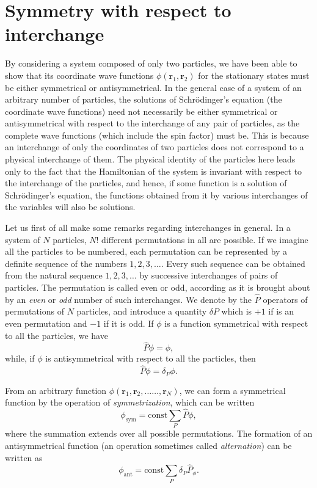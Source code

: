 \section{Symmetry with respect to interchange}\label{Symmetry with respect to interchange}
By considering a system composed of only two particles, we have been able to show that its coordinate wave functions $ \phi(\bm{r}_1, \bm{r}_2) $ for the stationary states must be either symmetrical or antisymmetrical. In the general case of a system of an arbitrary number of particles, the solutions of Schr\"odinger’s equation (the coordinate wave functions) need not necessarily be either symmetrical or antisymmetrical with respect to the interchange of any pair of particles, as the complete wave functions (which include the spin factor) must be. This is because an interchange of only the coordinates of two particles does not correspond to a physical interchange of them. The physical identity of the particles here leads only to the fact that the Hamiltonian of the system is invariant with respect to the interchange of the particles, and hence, if some function is a solution of Schr\"odinger’s equation, the functions obtained from it by various interchanges of the variables will also be solutions.

Let us first of all make some remarks regarding interchanges in general. In a system of $ N $ particles, $ N! $ different permutations in all are possible. If we imagine all the particles to be numbered, each permutation can be represented by a definite sequence of the numbers $ 1, 2, 3, \dots $. Every such sequence can be obtained from the natural sequence $ 1, 2, 3, \dots $ by successive interchanges of pairs of particles. The permutation is called even or odd, according as it is brought about by an \textit{even} or \textit{odd} number of such interchanges. We denote by the $ \hat{P} $ operators of permutations of $ N $ particles, and introduce a quantity $ \delta P $ which is $ +1 $ if is an even permutation and $ -1 $ if it is odd. If $\phi$ is a function symmetrical with respect to all the particles, we have
\[ \hat{P}\phi=\phi, \]
while, if $\phi$ is antisymmetrical with respect to all the particles, then
\[ \hat{P}\phi=\delta_P\phi. \]



From an arbitrary function $ \phi(\bm{r}_1, \bm{r}_2, …\dots, \bm{r}_N) $, we can form a symmetrical function by the operation of \textit{symmetrization}, which can be written
\begin{equation}\label{63.1}
\phi_{\text{sym}}=\mathrm{const}\sum_P\hat{P}\phi,
\end{equation}
where the summation extends over all possible permutations. The formation of an antisymmetrical function (an operation sometimes called \textit{alternation}) can be written as
\begin{equation}\label{63.2}
\phi_{\mathrm{ant}}=\mathrm{const}\sum_P\delta_P\hat{P}_\phi.
\end{equation}



